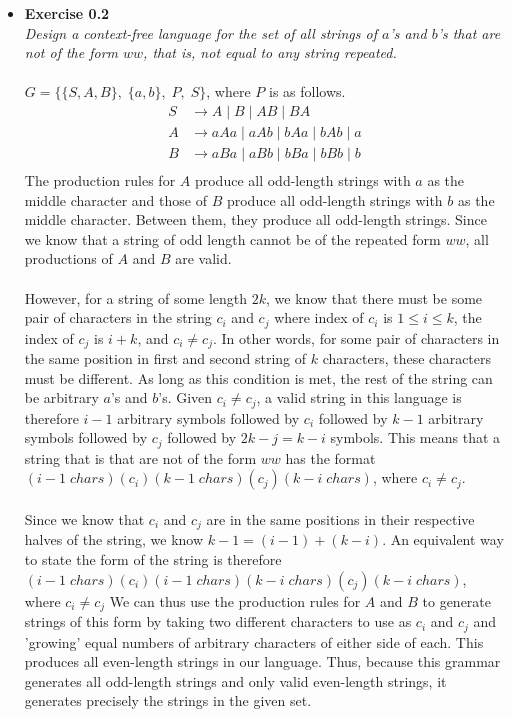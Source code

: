 \documentclass[12pt]{article}
\begin{document}
\begin{itemize}
\item{\textbf{Exercise 0.2}} \\
\emph{Design a context-free language for the set of all strings of $a$'s and $b$'s that are not of the form $ww$, that is, not equal to any string repeated.
} \\
\\
$G = \{\{S,A,B\},\; \{a,b\},\; P,\; S\}$, where $P$ is as follows. 
\begin{align}
\nonumber S &\rightarrow A\;|\;B\;|\;AB\;|\;BA \\
\nonumber A &\rightarrow aAa\;|\;aAb\;|\;bAa\;|\;bAb\;|\;a\\
\nonumber B &\rightarrow aBa\;|\;aBb\;|\;bBa\;|\;bBb\;|\;b\\
\end{align}
The production rules for $A$ produce all odd-length strings with $a$ as the middle character and those of $B$ produce all odd-length strings with $b$ as the middle character. Between them, they produce all odd-length strings. Since we know that a string of odd length cannot be of the repeated form $ww$, all productions of $A$ and $B$ are valid. \\
\\
However, for a string of some length $2k$, we know that there must be some pair of characters in the string $c_i$ and $c_j$ where index of $c_i$ is $1 \leq i \leq k$, the index of $c_j$ is $i + k$, and $c_i \neq c_j$. In other words, for some pair of characters in the same position in first and second string of $k$ characters, these characters must be different. As long as this condition is met, the rest of the string can be arbitrary $a$'s and $b$'s. Given $c_i \neq c_j$, a valid string in this language is therefore $i-1$ arbitrary symbols followed by $c_i$ followed by $k-1$ arbitrary symbols followed by $c_j$ followed by $2k-j = k - i$ symbols. This means that a string that is that are not of the form $ww$ has the format $(i-1\;chars)(c_i)(k-1\;chars)(c_j)(k-i\;chars)$, where $c_i \neq c_j$.\\
\\
Since we know that $c_i $ and $c_j$ are in the same positions in their respective halves of the string, we know $k-1 = (i-1)+(k-i)$. An equivalent way to state the form of the string is therefore $(i-1\;chars)(c_i)(i-1\;chars)(k-i\;chars)(c_j)(k-i\;chars)$, where $c_i \neq c_j$ 
We can thus use the production rules for $A$ and $B$ to generate strings of this form by taking two different characters to use as $c_i$ and $c_j$ and 'growing' equal numbers of arbitrary characters of either side of each. This produces all even-length strings in our language. Thus, because this grammar generates all odd-length strings and only valid even-length strings, it generates precisely the strings in the given set. \\
\\


\end{itemize}
\end{document}
